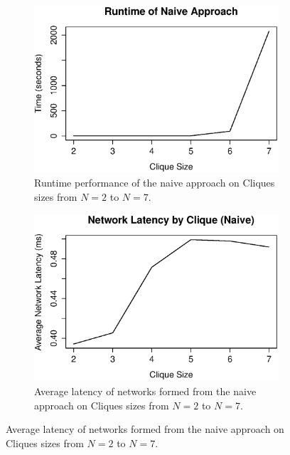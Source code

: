 \medskip
\begin{figure}[ht]
\begin{subfigure}{0.48\textwidth}
\includegraphics[width=\linewidth]{figures/naive-runtime}
\caption{Runtime performance of the naive approach on Cliques sizes from $N=2$ to $N=7$.}
\label{fig:naive-runtime}
\end{subfigure}\hspace*{\fill}
\begin{subfigure}{0.48\textwidth}
\includegraphics[width=\linewidth]{figures/naive-latency}
\caption{Average latency of networks formed from the naive approach on Cliques sizes from $N=2$ to $N=7$.}
\label{fig:naive-latency}
\end{subfigure}
\end{figure}

